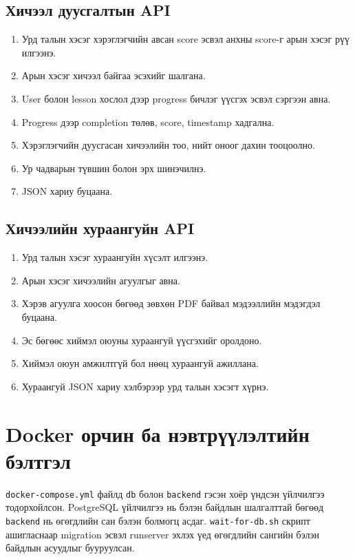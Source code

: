 \subsection{Хичээл дуусгалтын API}
\begin{enumerate}
\item Урд талын хэсэг хэрэглэгчийн авсан score эсвэл анхны score-г арын хэсэг рүү илгээнэ.
\item Арын хэсэг хичээл байгаа эсэхийг шалгана.
\item User болон lesson хослол дээр progress бичлэг үүсгэх эсвэл сэргээн авна.
\item Progress дээр completion төлөв, score, timestamp хадгална.
\item Хэрэглэгчийн дуусгасан хичээлийн тоо, нийт оноог дахин тооцоолно.
\item Ур чадварын түвшин болон эрх шинэчилнэ.
\item JSON хариу буцаана.
\end{enumerate}

\subsection{Хичээлийн хураангуйн API}
\begin{enumerate}
\item Урд талын хэсэг хураангуйн хүсэлт илгээнэ.
\item Арын хэсэг хичээлийн агуулгыг авна.
\item Хэрэв агуулга хоосон бөгөөд зөвхөн PDF байвал мэдээллийн мэдэгдэл буцаана.
\item Эс бөгөөс хиймэл оюуны хураангуй үүсгэхийг оролдоно.
\item Хиймэл оюун амжилтгүй бол нөөц хураангуй ажиллана.
\item Хураангуй JSON хариу хэлбэрээр урд талын хэсэгт хүрнэ.
\end{enumerate}

\section{Docker орчин ба нэвтрүүлэлтийн бэлтгэл}
\texttt{docker-compose.yml} файлд \texttt{db} болон \texttt{backend} гэсэн хоёр үндсэн үйлчилгээ тодорхойлсон. PostgreSQL үйлчилгээ нь бэлэн байдлын шалгалттай бөгөөд \texttt{backend} нь өгөгдлийн сан бэлэн болмогц асдаг. \texttt{wait-for-db.sh} скрипт ашигласнаар migration эсвэл runserver эхлэх үед өгөгдлийн сангийн бэлэн байдлын асуудлыг бууруулсан.


